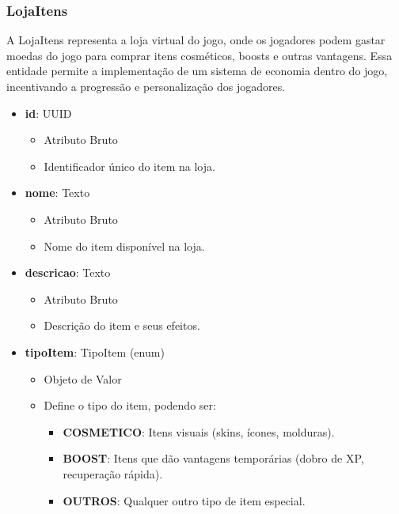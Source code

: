     \subsubsection{LojaItens}
    A LojaItens representa a loja virtual do jogo, onde os jogadores podem gastar moedas do jogo para comprar itens cosméticos, boosts e outras vantagens. Essa entidade permite a implementação de um sistema de economia dentro do jogo, incentivando a progressão e personalização dos jogadores.
    \begin{itemize}
        \item \textbf{id}: UUID  
              \begin{itemize}
                  \item Atributo Bruto
                  \item Identificador único do item na loja.
              \end{itemize}
    
        \item \textbf{nome}: Texto  
              \begin{itemize}
                  \item Atributo Bruto
                  \item Nome do item disponível na loja.
              \end{itemize}
    
        \item \textbf{descricao}: Texto  
              \begin{itemize}
                  \item Atributo Bruto
                  \item Descrição do item e seus efeitos.
              \end{itemize}
    
        \item \textbf{tipoItem}: TipoItem (enum)  
              \begin{itemize}
                  \item Objeto de Valor
                  \item Define o tipo do item, podendo ser:
                  \begin{itemize}
                      \item \textbf{COSMETICO}: Itens visuais (skins, ícones, molduras).
                      \item \textbf{BOOST}: Itens que dão vantagens temporárias (dobro de XP, recuperação rápida).
                      \item \textbf{OUTROS}: Qualquer outro tipo de item especial.
                  \end{itemize}
              \end{itemize}
    

\end{itemize}
